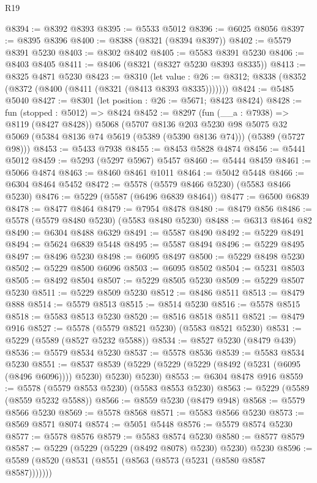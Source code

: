 \begin{lexlean}{R19}
\begin{coremodule}
@8394 := @8392 @8393
@8395 := @5533 @5012
@8396 := @6025 @8056
@8397 := @8395 @8396
@8400 := @8388 (@8321 (@8394 @8397))
@8402 := @5579 @8391 @5230
@8403 := @8302 @8402
@8405 := @5583 @8391 @5230
@8406 := @8403 @8405
@8411 := @8406 (@8321 (@8327 @5230 @8393 @8335))
@8413 := @8325 @4871 @5230
@8423 := @8310
    (let value : @26 := @8312; @8338 (@8352 (@8372 (@8400 (@8411 (@8321 (@8413 @8393 @8335)))))))
@8424 := @5485 @5040
@8427 := @8301 (let position : @26 := @5671; @8423 @8424)
@8428 := fun (stopped : @5012) => @8424
@8452 := @8297
    (fun (__a : @7938) => @8119 (@8427 @8428))
    @5068
    (@5707
      @8136
      @203
      @5230
      @98
      @5075
      @32
      @5069
      (@5384 @8136 @74 @5619 (@5389 (@5390 @8136 @74)))
      (@5389 (@5727 @98)))
@8453 := @5433 @7938
@8455 := @8453 @5828 @4874
@8456 := @5441 @5012
@8459 := @5293 (@5297 @5967) @5457
@8460 := @5444 @8459
@8461 := @5066 @4874
@8463 := @8460 @8461 @1011
@8464 := @5042 @5448
@8466 := @6304 @8464 @5452
@8472 := @5578 (@5579 @8466 @5230) (@5583 @8466 @5230)
@8476 := @5229 (@5587 (@6496 @6839 @8464))
@8477 := @6500 @6839
@8478 := @8477 @8464
@8479 := @7954 @8478
@8480 := @8479 @856
@8486 := @5578 (@5579 @8480 @5230) (@5583 @8480 @5230)
@8488 := @6313 @8464 @82
@8490 := @6304 @8488 @6329
@8491 := @5587 @8490
@8492 := @5229 @8491
@8494 := @5624 @6839 @5448
@8495 := @5587 @8494
@8496 := @5229 @8495
@8497 := @8496 @5230
@8498 := @6095 @8497
@8500 := @5229 @8498 @5230
@8502 := @5229 @8500 @6096
@8503 := @6095 @8502
@8504 := @5231 @8503
@8505 := @8492 @8504
@8507 := @5229 @8505 @5230
@8509 := @5229 @8507 @5230
@8511 := @5229 @8509 @5230
@8512 := @8486 @8511
@8513 := @8479 @888
@8514 := @5579 @8513
@8515 := @8514 @5230
@8516 := @5578 @8515
@8518 := @5583 @8513 @5230
@8520 := @8516 @8518 @8511
@8521 := @8479 @916
@8527 := @5578 (@5579 @8521 @5230) (@5583 @8521 @5230)
@8531 := @5229 (@5589 (@8527 @5232 @5588))
@8534 := @8527 @5230 (@8479 @439)
@8536 := @5579 @8534 @5230
@8537 := @5578 @8536
@8539 := @5583 @8534 @5230
@8551 := @8537 @8539 (@5229 (@5229 (@5229 (@8492 (@5231 (@6095 (@8496 @6096)))) @5230) @5230) @5230)
@8553 := @6304 @8478 @916
@8559 := @5578 (@5579 @8553 @5230) (@5583 @8553 @5230)
@8563 := @5229 (@5589 (@8559 @5232 @5588))
@8566 := @8559 @5230 (@8479 @948)
@8568 := @5579 @8566 @5230
@8569 := @5578 @8568
@8571 := @5583 @8566 @5230
@8573 := @8569 @8571 @8074
@8574 := @5051 @5448
@8576 := @5579 @8574 @5230
@8577 := @5578 @8576
@8579 := @5583 @8574 @5230
@8580 := @8577 @8579
@8587 := @5229 (@5229 (@5229 (@8492 @8078) @5230) @5230) @5230
@8596 := @5589 (@8520 (@8531 (@8551 (@8563 (@8573 (@5231 (@8580 @8587 @8587)))))))

\end{coremodule}
\end{lexlean}

